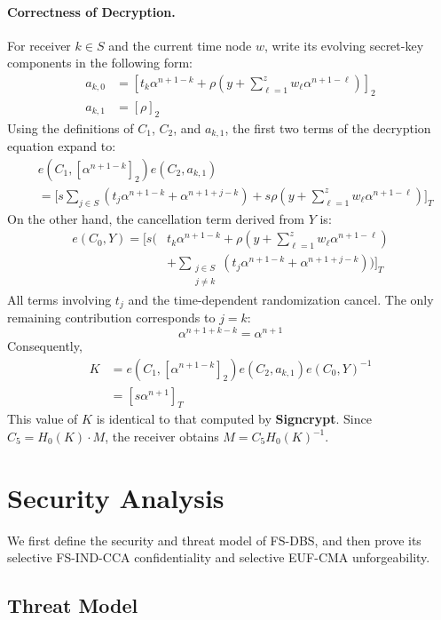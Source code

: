 \documentclass[sigconf,anonymous]{acmart}
\theoremstyle{definition}
\theoremstyle{definition}
\theoremstyle{definition}
\theoremstyle{definition}
\theoremstyle{definition}
\theoremstyle{definition}
\theoremstyle{definition}
\theoremstyle{definition}
\theoremstyle{definition}
\begin{document}
\paragraph{Correctness of Decryption.}
For receiver $k\in S$ and the current time node $w$, write its evolving
secret-key components in the following form:
\[
\begin{aligned}
	a_{k,0}
	&=
	\left[
	t_k\alpha^{n+1-k}
	+
	\rho
	\left(
	y+
	\sum_{\ell=1}^{z}
	w_\ell\alpha^{n+1-\ell}
	\right)
	\right]_2
	\\
	a_{k,1}
	&=
	[\rho]_2
\end{aligned}
\]
Using the definitions of $C_1$, $C_2$, and $a_{k,1}$, the first two
terms of the decryption equation expand to:
\[
\begin{aligned}
	&e(C_1,[\alpha^{n+1-k}]_2)e(C_2,a_{k,1})
	\\
	&=
	\Bigg[
	s\sum_{j\in S}
	\left(
	t_j\alpha^{n+1-k}
	+
	\alpha^{n+1+j-k}
	\right)
	+
	s\rho
	\left(
	y+
	\sum_{\ell=1}^{z}
	w_\ell\alpha^{n+1-\ell}
	\right)
	\Bigg]_T
\end{aligned}
\]
On the other hand, the cancellation term derived from $Y$ is:
\[
\begin{aligned}
	e(C_0,Y)
	=
	\Bigg[
	s\Bigg(
	&t_k\alpha^{n+1-k}
	+
	\rho
	\left(
	y+
	\sum_{\ell=1}^{z}
	w_\ell\alpha^{n+1-\ell}
	\right)
	\\
	&+
	\sum_{\substack{j\in S\\j\neq k}}
	\left(
	t_j\alpha^{n+1-k}
	+
	\alpha^{n+1+j-k}
	\right)
	\Bigg)
	\Bigg]_T
\end{aligned}
\]
All terms involving $t_j$ and the time-dependent randomization cancel.
The only remaining contribution corresponds to $j=k$:
\[
\alpha^{n+1+k-k}=\alpha^{n+1}
\]
Consequently,
\[
\begin{aligned}
	K
	&=
	e(C_1,[\alpha^{n+1-k}]_2)
	e(C_2,a_{k,1})
	e(C_0,Y)^{-1}
	\\
	&=
	[s\alpha^{n+1}]_T
\end{aligned}
\]
This value of $K$ is identical to that computed by \textbf{Signcrypt}.
Since $C_5=H_0(K)\cdot M$, the receiver obtains
$M=C_5H_0(K)^{-1}$.
\section{Security Analysis}
We first define the security and threat model of FS-DBS, and then prove its selective FS-IND-CCA confidentiality and selective EUF-CMA unforgeability.



\subsection{Threat Model}
\end{document}
